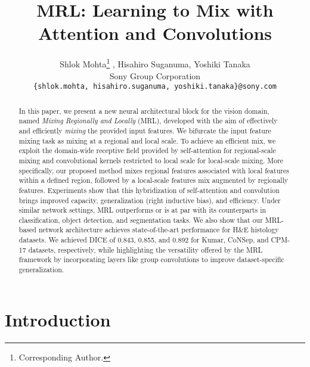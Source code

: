 \documentclass{article}
\title{MRL: Learning to Mix with Attention and Convolutions}
\author{Shlok Mohta\thanks{Corresponding Author.}
   , Hisahiro Suganuma, Yoshiki Tanaka \\
  Sony Group Corporation \\
  \texttt{\{shlok.mohta, hisahiro.suganuma, yoshiki.tanaka\}@sony.com} \\
}
\begin{document}
\maketitle

\begin{abstract}
In this paper, we present a new neural architectural block for the vision domain, named \textit{Mixing Regionally and Locally} (MRL), developed with the aim of effectively and efficiently \textit{mixing} the provided input features. We bifurcate the input feature mixing task as mixing at a regional and local scale. To achieve an efficient mix, we exploit the domain-wide receptive field provided by self-attention for regional-scale mixing and convolutional kernels restricted to local scale for local-scale mixing. More specifically, our proposed method mixes regional features associated with local features within a defined region, followed by a local-scale features mix augmented by regionally features. Experiments show that this hybridization of self-attention and convolution brings improved capacity, generalization (right inductive bias), and efficiency. Under similar network settings, MRL outperforms or is at par with its counterparts in classification, object detection, and segmentation tasks. We also show that our MRL-based network architecture achieves state-of-the-art performance for H\&E histology datasets. We achieved DICE of 0.843, 0.855, and 0.892 for Kumar, CoNSep, and CPM-17 datasets, respectively, while highlighting the versatility offered by the MRL framework by incorporating layers like group convolutions to improve dataset-specific generalization. 
\end{abstract}

\section{Introduction}
\end{document}
